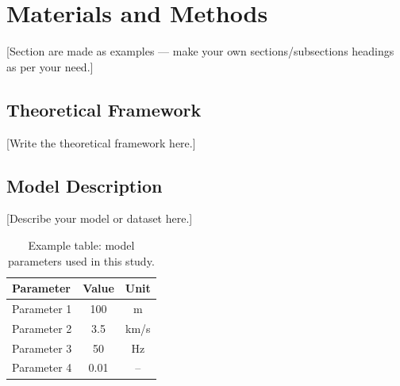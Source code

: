 


\chapter{Materials and Methods}
\label{chap:methods}

[Section are made as examples — make your own sections/subsections headings as per your need.]


\section{Theoretical Framework}
\label{sec:theory}


[Write the theoretical framework here.]

\section{Model Description}
\label{sec:model}


[Describe your model or dataset here.]


\begin{table}[htbp]
  \centering
  \caption{Example table: model parameters used in this study.}
  \label{tab:model_parameters}
  \begin{tabular}{lcc}
    \toprule
    \textbf{Parameter} & \textbf{Value} & \textbf{Unit} \\
    \midrule
    Parameter 1        & 100            & m             \\
    Parameter 2        & 3.5            & km/s          \\
    Parameter 3        & 50             & Hz            \\
    Parameter 4        & 0.01           & --            \\
    \bottomrule
  \end{tabular}
\end{table}

